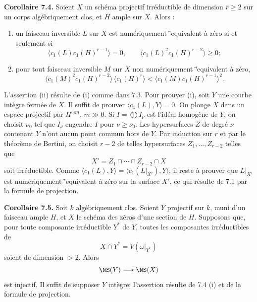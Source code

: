 \documentclass[11pt]{article}
\begin{document}
\textbf{Corollaire 7.4.} Soient $X$ un sch\'ema projectif irr\'eductible de dimension $r\ge2$ sur un corps alg\'ebriquement clos, et $H$ ample sur $X$. Alors :
\begin{enumerate}[label=\roman*)]
\item un faisceau inversible $L$ sur $X$ est num\'eriquement \='equivalent \`a z\'ero si et seulement si
\[
   \langle c_1(L)c_1(H)^{r-1}\rangle=0,
   \qquad
   \langle c_1(L)^2c_1(H)^{r-2}\rangle\ge0;
\]
\item pour tout faisceau inversible $M$ sur $X$ non num\'eriquement \='equivalent \`a z\'ero,
\[
   \langle c_1(M)^2c_1(H)^{r-2}\rangle\,\langle c_1(H)^r\rangle
   <\langle c_1(M)c_1(H)^{r-1}\rangle^2.
\]
\end{enumerate}
L'assertion (ii) r\'esulte de (i) comme dans 7.3. Pour prouver (i), soit $Y$ une courbe int\`egre ferm\'ee de $X$. Il suffit de prouver $\langle c_1(L),Y\rangle=0$. On plonge $X$ dans un espace projectif par $H^{\otimes m}$, $m\gg0$. Si $I=\bigoplus I_\nu$ est l'id\'eal homog\`ene de $Y$, on choisit $\nu_0$ tel que $I_\nu$ engendre $I$ pour $\nu\ge\nu_0$. Les hypersurfaces $Z$ de degr\'e $\nu$ contenant $Y$ n'ont aucun point commun hors de $Y$. Par induction sur $r$ et par le th\'eor\`eme de Bertini, on choisit $r-2$ de telles hypersurfaces $Z_1,\ldots,Z_{r-2}$ telles que
\[
   X'=Z_1\cap\cdots\cap Z_{r-2}\cap X
\]
soit irr\'eductible. Comme $\langle c_1(L),Y\rangle=\langle c_1(L|_{X'}),Y\rangle$, il reste \`a prouver que $L|_{X'}$ est num\'eriquement \='equivalent \`a z\'ero sur la surface $X'$, ce qui r\'esulte de 7.1 par la formule de projection.

\textbf{Corollaire 7.5.} Soit $k$ alg\'ebriquement clos. Soient $Y$ projectif sur $k$, muni d'un faisceau ample $H$, et $X$ le sch\'ema des z\'eros d'une section de $H$. Supposons que, pour toute composante irr\'eductible $Y^*$ de $Y$, toutes les composantes irr\'eductibles de
\[
   X\cap Y^*=V(\omega|_{Y^*})
\]
soient de dimension $>2$. Alors
\[
   \NS(Y)\longrightarrow \NS(X)
\]
est injectif. Il suffit de supposer $Y$ int\`egre; l'assertion r\'esulte de 7.4 (i) et de la formule de projection.
\end{document}

